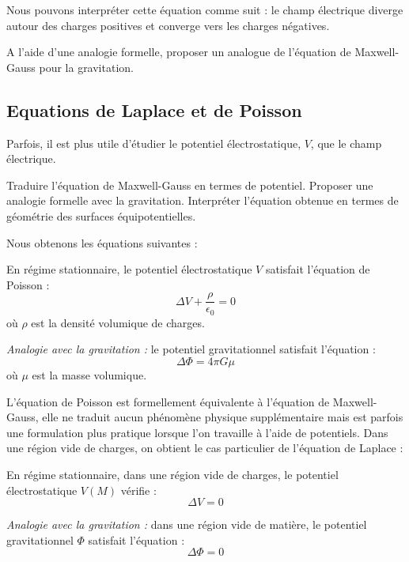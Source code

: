 \documentclass[11pt,fleqn]{book} %
\begin{document}
Nous pouvons interpréter cette équation comme suit : le champ électrique diverge autour des charges positives et converge vers les charges négatives.

\begin{capex}
	A l'aide d'une analogie formelle, proposer un analogue de l'équation de Maxwell-Gauss pour la gravitation.
\end{capex}

\subsection{Equations de Laplace et de Poisson}

Parfois, il est plus utile d'étudier le potentiel électrostatique, $V$, que le champ électrique. 

\begin{capex}
	Traduire l'équation de Maxwell-Gauss en termes de potentiel. Proposer une analogie formelle avec la gravitation. Interpréter l'équation obtenue en termes de géométrie des surfaces équipotentielles.
\end{capex}

Nous obtenons les équations suivantes :
\begin{theorem}
	En régime stationnaire, le potentiel électrostatique $V$ satisfait l'équation de Poisson :
	\begin{equation}
		\Delta V + \frac{\rho}{\epsilon_0} = 0
	\end{equation}
	où $\rho$ est la densité volumique de charges.

	\textit{Analogie avec la gravitation :} le potentiel gravitationnel satisfait l'équation :
	\begin{equation}
		\Delta \Phi = 4 \pi G \mu
	\end{equation}
	où $\mu$ est la masse volumique.
\end{theorem}

L'équation de Poisson est formellement équivalente à l'équation de Maxwell-Gauss, elle ne traduit aucun phénomène physique supplémentaire mais est parfois une formulation plus pratique lorsque l'on travaille à l'aide de potentiels. Dans une région vide de charges, on obtient le cas particulier de l'équation de Laplace :
\begin{theorem}
	En régime stationnaire, dans une région vide de charges, le potentiel électrostatique $V(M)$ vérifie :
	\begin{equation}
		\Delta V = 0
	\end{equation}
	
	\textit{Analogie avec la gravitation :} dans une région vide de matière, le potentiel gravitationnel $\Phi$ satisfait l'équation :
	\begin{equation}
		\Delta \Phi = 0
	\end{equation}
\end{theorem}
\end{document}
